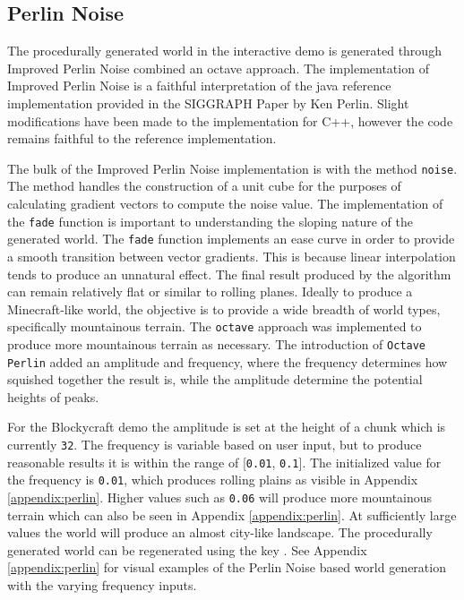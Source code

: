 \documentclass[a4paper,11pt,titlepage]{scrartcl}
\newcommand{\Blockycraft}{Blockycraft}
\begin{document}
\subsection{Perlin Noise}
\label{section:perlin}
The procedurally generated world in the interactive demo is generated through Improved Perlin Noise combined an octave approach. The implementation of Improved Perlin Noise is a faithful interpretation of the java reference implementation provided in the SIGGRAPH Paper by Ken Perlin. Slight modifications have been made to the implementation for C++, however the code remains faithful to the reference implementation.

The bulk of the Improved Perlin Noise implementation is with the method \texttt{noise}. The method handles the construction of a unit cube for the purposes of calculating gradient vectors to compute the noise value. The implementation of the \texttt{fade} function is important to understanding the sloping nature of the generated world. The \texttt{fade} function implements an ease curve in order to provide a smooth transition between vector gradients. This is because linear interpolation tends to produce an unnatural effect. The final result produced by the algorithm can remain relatively flat or similar to rolling planes. Ideally to produce a Minecraft-like world, the objective is to provide a wide breadth of world types, specifically mountainous terrain. The \texttt{octave} approach was implemented to produce more mountainous terrain as necessary. The introduction of \texttt{Octave Perlin} added an amplitude and frequency, where the frequency determines how squished together the result is, while the amplitude determine the potential heights of peaks.
    
For the \Blockycraft{} demo the amplitude is set at the height of a chunk which is currently \texttt{32}. The frequency is variable based on user input, but to produce reasonable results it is within the range of [\texttt{0.01}, \texttt{0.1}]. The initialized value for the frequency is \texttt{0.01}, which produces rolling plains as visible in Appendix \ref{appendix:perlin}. Higher values such as \texttt{0.06} will produce more mountainous terrain which can also be seen in Appendix \ref{appendix:perlin}. At sufficiently large values the world will produce an almost city-like landscape.
\vskip 2.5mm\noindent
The procedurally generated world can be regenerated using the key . See Appendix \ref{appendix:perlin} for visual examples of the Perlin Noise based world generation with the varying frequency inputs.
    
\end{document}
